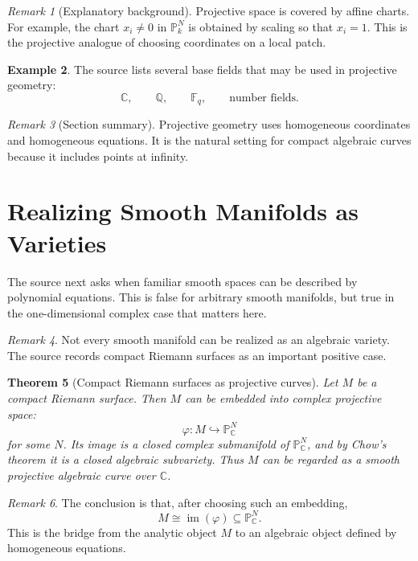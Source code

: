 \documentclass[11pt]{article}
\newtheorem{theorem}{Theorem}[section]
\theoremstyle{definition}
\newtheorem{example}[theorem]{Example}
\theoremstyle{remark}
\newtheorem{remark}[theorem]{Remark}
\newcommand{\C}{\mathbb{C}}
\newcommand{\F}{\mathbb{F}}
\newcommand{\Pj}{\mathbb{P}}
\newcommand{\Q}{\mathbb{Q}}
\newcommand{\image}{\operatorname{im}}
\begin{document}
\begin{remark}[Explanatory background]
Projective space is covered by affine charts.  For example, the chart
\(x_i\neq 0\) in \(\Pj^N_k\) is obtained by scaling so that \(x_i=1\).  This
is the projective analogue of choosing coordinates on a local patch.
\end{remark}

\begin{example}
The source lists several base fields that may be used in projective geometry:
\[
  \C,\qquad \Q,\qquad \F_q,\qquad \text{number fields}.
\]
\end{example}

\begin{remark}[Section summary]
Projective geometry uses homogeneous coordinates and homogeneous equations.
It is the natural setting for compact algebraic curves because it includes
points at infinity.
\end{remark}

\section{Realizing Smooth Manifolds as Varieties}

The source next asks when familiar smooth spaces can be described by
polynomial equations.  This is false for arbitrary smooth manifolds, but true
in the one-dimensional complex case that matters here.

\begin{remark}
Not every smooth manifold can be realized as an algebraic variety.  The source
records compact Riemann surfaces as an important positive case.
\end{remark}

\begin{theorem}[Compact Riemann surfaces as projective curves]
Let \(M\) be a compact Riemann surface.  Then \(M\) can be embedded into
complex projective space:
\[
  \varphi\colon M\hookrightarrow \Pj^N_{\C}
\]
for some \(N\).  Its image is a closed complex submanifold of
\(\Pj^N_{\C}\), and by Chow's theorem it is a closed algebraic subvariety.
Thus \(M\) can be regarded as a smooth projective algebraic curve over
\(\C\).
\end{theorem}

\begin{remark}
The conclusion is that, after choosing such an embedding,
\[
  M\cong \image(\varphi)\subseteq \Pj^N_{\C}.
\]
This is the bridge from the analytic object \(M\) to an algebraic object
defined by homogeneous equations.
\end{remark}
\end{document}
